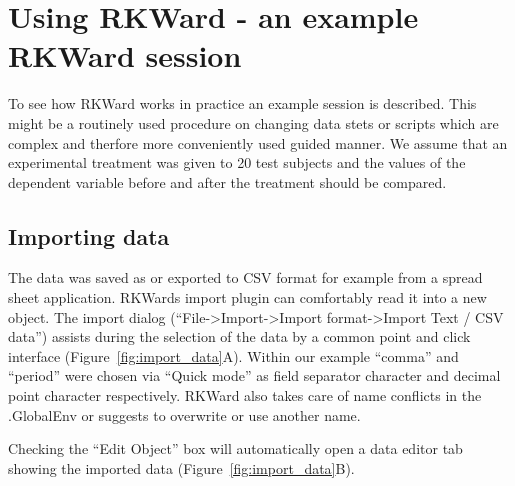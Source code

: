 \section{Using RKWard - an example RKWard session}
\label{sec:using_RKWard}
To see how RKWard works in practice an example session is described.
This might be a routinely used procedure on changing data stets or
 scripts which are complex and therfore
more conveniently used guided manner. We assume that an experimental
treatment was given to 20 test subjects and the values of the dependent
variable before and after the treatment should be compared. 

\subsection{Importing data}
\label{sec:importing_data}
The data was saved as or exported to CSV format for example from a
spread sheet application. RKWards import plugin can
comfortably read it into a new  object.
The import dialog (``File->Import->Import
format->Import Text / CSV data'') assists during the
selection of the data by a common point and click interface (Figure~\ref{fig:import_data}A). Within our
example ``comma'' and ``period'' were chosen via ``Quick mode'' as field
separator character and decimal point character respectively. RKWard
also takes care of name conflicts in the .GlobalEnv or suggests to
overwrite or use another name.


Checking the ``Edit Object'' box will automatically open a data editor tab
showing the imported data (Figure~\ref{fig:import_data}B).

